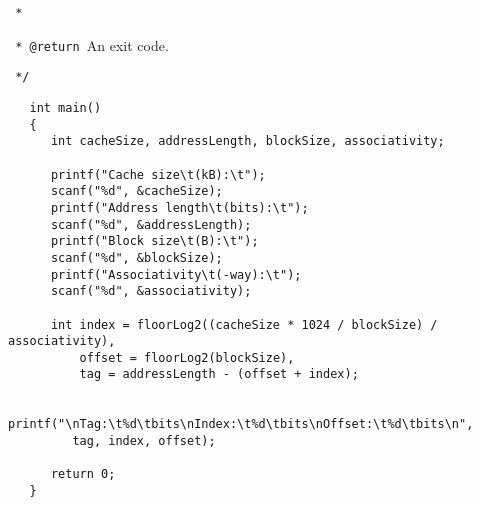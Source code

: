 \documentclass[12pt]{article}
\begin{document}
\verb| * |

\verb| * @return |An exit code.

\verb| */|
\begin{verbatim}
   int main()
   {
      int cacheSize, addressLength, blockSize, associativity;
    
      printf("Cache size\t(kB):\t");
      scanf("%d", &cacheSize);
      printf("Address length\t(bits):\t");
      scanf("%d", &addressLength);
      printf("Block size\t(B):\t");
      scanf("%d", &blockSize);
      printf("Associativity\t(-way):\t");
      scanf("%d", &associativity);
    
      int index = floorLog2((cacheSize * 1024 / blockSize) / associativity),
          offset = floorLog2(blockSize),
          tag = addressLength - (offset + index);
    
      printf("\nTag:\t%d\tbits\nIndex:\t%d\tbits\nOffset:\t%d\tbits\n",
         tag, index, offset);
         
      return 0;
   }
\end{verbatim}
\end{document}
